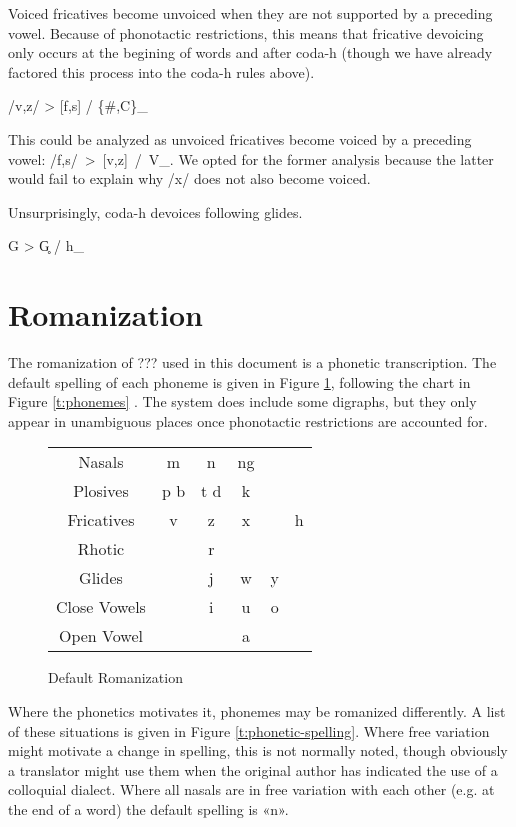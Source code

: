 \documentclass[12pt]{book} %
\begin{document}
Voiced fricatives become unvoiced when they are not supported by a preceding vowel.
Because of phonotactic restrictions, this means that fricative devoicing only occurs at the begining of words and after coda-h (though we have already factored this process into the coda-h rules above).
\begin{center}
/v,z/ > [f,s] / \{\#,C\}\_
\end{center}
This could be analyzed as unvoiced fricatives become voiced by a preceding vowel: /f,s/~>~[v,z]~/~V\_.
We opted for the former analysis because the latter would fail to explain why /x/ does not also become voiced.

Unsurprisingly, coda-h devoices following glides.
\begin{center}
	G > G̥ / h\_
\end{center}





\section{Romanization}

The romanization of ??? used in this document is a phonetic transcription.
The default spelling of each phoneme is given in Figure \ref{t:phoneme-spelling}, following the chart in Figure \ref{t:phonemes} .
The system does include some digraphs, but they only appear in unambiguous places once phonotactic restrictions are accounted for.

\begin{figure}[H]
\centering
	\begin{tabular}{cccccc}
	Nasals		&	m	& n		& ng 			\\
	Plosives		&	p b	& t d	& k 		\\
	Fricatives	&	v	& z		& x	&	& h	\\
	Rhotic		&	  	& r					\\
	Glides		&	  	& j		& w	& y		\\
	Close Vowels	&	  	& i		& u	& o		\\
	Open Vowel	& 	  	&		& a	&		\\
	\end{tabular}
\caption{Default Romanization}\label{t:phoneme-spelling}
\end{figure}

Where the phonetics motivates it, phonemes may be romanized differently.
A list of these situations is given in Figure \ref{t:phonetic-spelling}.
Where free variation might motivate a change in spelling, this is not normally noted, though obviously a translator might use them when the original author has indicated the use of a colloquial dialect.
Where all nasals are in free variation with each other (e.g. at the end of a word) the default spelling is «n».
\end{document}

